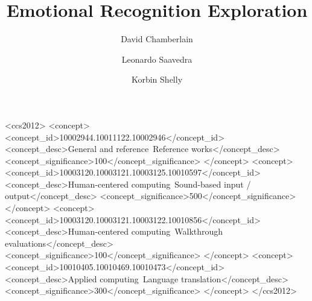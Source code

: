 \documentclass[acmsmall,nonacm,natbib=false]{acmart}
\begin{document}
\title{Emotional Recognition Exploration}

\author{David Chamberlain}

\author{Leonardo Saavedra}

\author{Korbin Shelly}

\renewcommand{\shortauthors}{Chamberlain,Saavedra,Shelly}

\begin{abstract}
\end{abstract}


\begin{CCSXML}
	<ccs2012>
	<concept>
	<concept_id>10002944.10011122.10002946</concept_id>
	<concept_desc>General and reference~Reference works</concept_desc>
	<concept_significance>100</concept_significance>
	</concept>
	<concept>
	<concept_id>10003120.10003121.10003125.10010597</concept_id>
	<concept_desc>Human-centered computing~Sound-based input / output</concept_desc>
	<concept_significance>500</concept_significance>
	</concept>
	<concept>
	<concept_id>10003120.10003121.10003122.10010856</concept_id>
	<concept_desc>Human-centered computing~Walkthrough evaluations</concept_desc>
	<concept_significance>100</concept_significance>
	</concept>
	<concept>
	<concept_id>10010405.10010469.10010473</concept_id>
	<concept_desc>Applied computing~Language translation</concept_desc>
	<concept_significance>300</concept_significance>
	</concept>
	</ccs2012>
\end{CCSXML}
\end{document}
